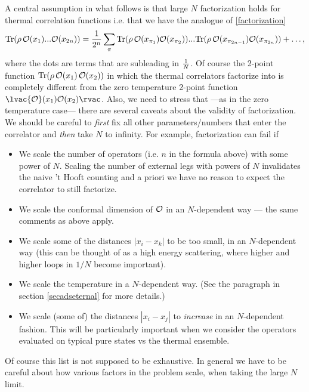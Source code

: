 A central assumption in what follows is that large $N$ factorization holds for thermal correlation functions i.e. that we have the analogue of \eqref{factorization}
\[
{\rm Tr}(\rho \,{\cal O}(x_1)...{\cal O}(x_{2n})) = {1\over 2^n} \sum_\pi
{\rm Tr}(\rho \,{\cal O}(x_{\pi_1}) {\cal O}(x_{\pi_2}))...{\rm Tr}(\rho \,{\cal O}(x_{\pi_{2n-1}}) {\cal O}(x_{\pi_{2n}})) + \ldots,
\]
where the dots are terms that are subleading in ${1 \over N}$. 
Of course the 2-point function ${\rm Tr}(\rho\, {\cal O}(x_1)\, {\cal O}(x_2))$ in which the thermal correlators factorize into is completely different 
from the zero temperature 2-point function $\lvac {\cal O}(x_1) {\cal O}(x_2) \rvac$. Also, we need to stress that ---as in the zero temperature case---
there are several caveats about the validity of factorization. We should be careful to {\it first} fix all other parameters/numbers that enter the correlator and {\it then} take $N$ to infinity. For example, factorization can fail if

\begin{itemize}
\item We scale the number of operators (i.e. $n$ in the formula above) with some power of $N$. Scaling the number of external legs with powers of $N$ invalidates the naive 't Hooft counting and a priori we have no reason to expect the correlator to still factorize.

\item We scale the conformal dimension of ${\cal O}$ in an $N$-dependent way --- the same comments as above apply.

\item We scale some of the distances $|x_i-x_k|$ to be too small, in an $N$-dependent way (this can be thought of as a high energy scattering, where higher and higher loops in $1/N$ become important).

\item We scale the temperature in a $N$-dependent way. (See the paragraph in section \ref{secadseternal} for more details.)

\item We scale (some of) the distances $|x_i-x_j|$ to {\it increase} in an $N$-dependent fashion. This will be particularly important when we consider the operators evaluated on
typical pure states vs the thermal ensemble.

\end{itemize}
Of course this list is not supposed to be exhaustive. In general we have to be careful about how various factors in the problem scale, when taking the large $N$ limit.



